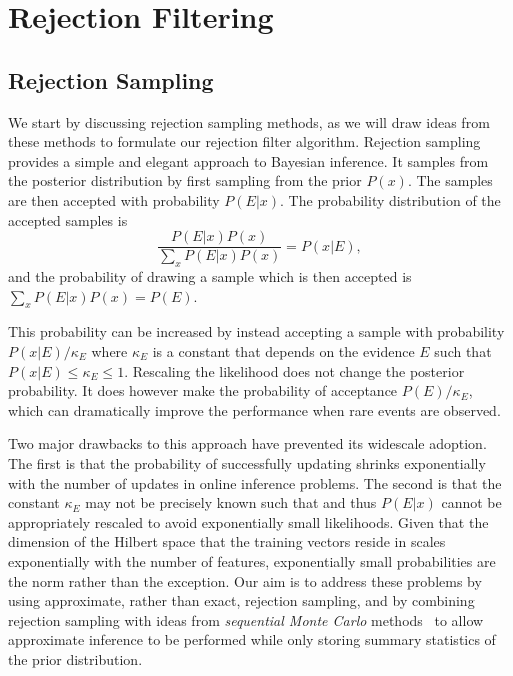 \documentclass{article} %
\begin{document}
\section{Rejection Filtering}
\label{sec:method}

\subsection{Rejection Sampling}
\label{sec:smc}

We start by discussing rejection sampling methods, as we
will draw ideas from these methods to formulate our rejection filter algorithm.
Rejection sampling provides a simple and elegant approach to Bayesian inference. 
It samples
from the posterior distribution by first sampling from the prior $P(x)$.
The samples are then accepted with
probability $P(E|x)$.  The probability 
distribution of the accepted samples is 
\begin{equation}
  \frac{P(E|x)P(x)}{\sum_x P(E|x)P(x)}= P(x|E),
\end{equation}
and the probability of drawing a sample which is then accepted is $\sum_x P(E|x)P(x)=P(E)$.  

This probability
can be increased by instead accepting a sample with probability $P(x|E)/\kappa_E$ where
$\kappa_E$ is a constant that depends on the evidence $E$ such that $P(x|E) \le \kappa_E \le 1$.
Rescaling the likelihood does not change the posterior probability.
It does however make the probability of acceptance $P(E)/\kappa_E$, which
can dramatically improve the performance when rare events are observed.

Two major drawbacks to this approach have prevented its widescale adoption.  The first is that the probability of successfully updating shrinks exponentially with the number of updates
in online inference problems.
The second is that the constant $\kappa_E$ may not be precisely known such that and thus $P(E|x)$ cannot be appropriately rescaled to avoid exponentially small likelihoods.  Given that the dimension of the Hilbert space that the training vectors reside in scales exponentially with the number of features, exponentially small probabilities are the norm rather than the exception. 
Our aim is to address these problems
by using approximate, rather than exact, rejection sampling, and
by combining rejection sampling with ideas from  \emph{sequential Monte Carlo} methods~\cite{doucet2000sequential,del2012adaptive,van2000unscented,liu2001combined} to allow approximate inference to be performed while only storing summary statistics of the prior distribution.
\end{document}
